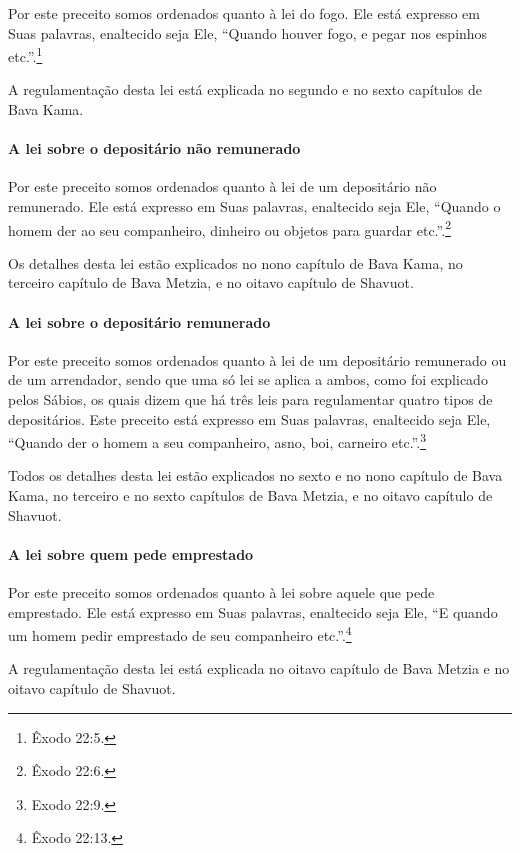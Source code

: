 \begin{multicols}{2}
Por este preceito somos ordenados quanto à lei do fogo. Ele está
expresso em Suas palavras, enaltecido seja Ele, ``Quando houver fogo, e
pegar nos espinhos etc.''.\footnote{Êxodo 22:5.}

A regulamentação desta lei está explicada no segundo e no sexto
capítulos de Bava Kama\starr.

\paragraph{A lei sobre o depositário não remunerado}

Por este preceito somos ordenados quanto à lei de um depositário não
remunerado. Ele está expresso em Suas palavras, enaltecido seja Ele,
``Quando o homem der ao seu companheiro, dinheiro ou objetos para
guardar etc.''.\footnote{Êxodo 22:6.}

Os detalhes desta lei estão explicados no nono capítulo de Bava Kama\starr,
no terceiro capítulo de Bava Metzia\starr, e no oitavo capítulo de Shavuot\starr.

\paragraph{A lei sobre o depositário remunerado}

Por este preceito somos ordenados quanto à lei de um depositário
remunerado ou de um arrendador, sendo que uma só lei se aplica a ambos,
como foi explicado pelos Sábios, os quais dizem que há três leis para
regulamentar quatro tipos de depositários. Este preceito está expresso
em Suas palavras, enaltecido seja Ele, ``Quando der o homem a seu
companheiro, asno, boi, carneiro etc.''.\footnote{Exodo 22:9.}

Todos os detalhes desta lei estão explicados no sexto e no nono
capítulo de Bava Kama\starr, no terceiro e no sexto capítulos de Bava
Metzia\starr, e no oitavo capítulo de Shavuot\starr.

\paragraph{A lei sobre quem pede emprestado}

Por este preceito somos ordenados quanto à lei sobre aquele que pede
emprestado. Ele está expresso em Suas palavras, enaltecido seja Ele, ``E
quando um homem pedir emprestado de seu companheiro etc.''.\footnote{Êxodo
22:13.}

A regulamentação desta lei está explicada no oitavo capítulo de Bava
Metzia\starr{} e no oitavo capítulo de Shavuot\starr.


\end{multicols}
